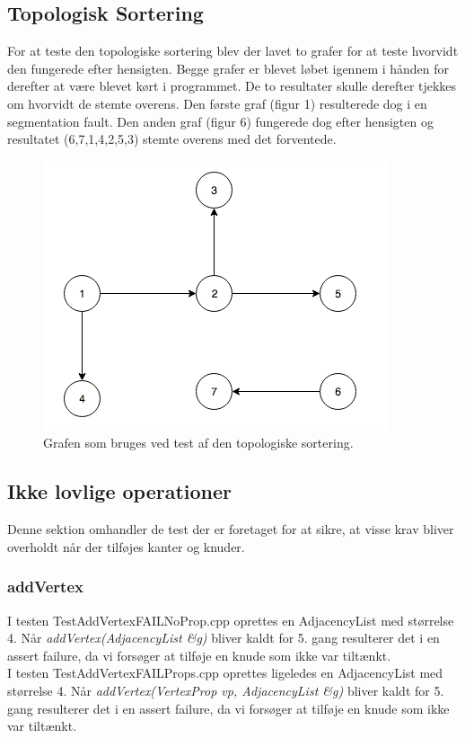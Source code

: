 \documentclass[a4paper,10pt,titlepage]{article}
\begin{document}
\subsection{Topologisk Sortering}
For at teste den topologiske sortering blev der lavet to grafer for at teste hvorvidt den fungerede efter hensigten. Begge grafer er blevet løbet igennem i hånden for derefter at være blevet kørt i programmet. De to resultater skulle derefter tjekkes om hvorvidt de stemte overens. Den første graf (figur 1) resulterede dog i en segmentation fault. Den anden graf (figur 6) fungerede dog efter hensigten og resultatet (6,7,1,4,2,5,3) stemte overens med det forventede.
\begin{figure}[H]
\centering
\includegraphics[scale=0.5]{Billeder/DFSGraph.png}
\caption{Grafen som bruges ved test af den topologiske sortering.}
\end{figure}


\subsection{Ikke lovlige operationer}
Denne sektion omhandler de test der er foretaget for at sikre, at visse krav bliver overholdt når der tilføjes kanter og knuder.
\subsubsection{addVertex}
I testen TestAddVertexFAILNoProp.cpp oprettes en AdjacencyList med størrelse 4. Når \textit{addVertex(AdjacencyList \&g)} bliver kaldt for 5. gang resulterer det i en assert failure, da vi forsøger at tilføje en knude som ikke var tiltænkt.\\

I testen TestAddVertexFAILProps.cpp oprettes ligeledes en AdjacencyList med størrelse 4. Når \textit{addVertex(VertexProp vp, AdjacencyList \&g)} bliver kaldt for 5. gang resulterer det i en assert failure, da vi forsøger at tilføje en knude som ikke var tiltænkt.
\end{document}
